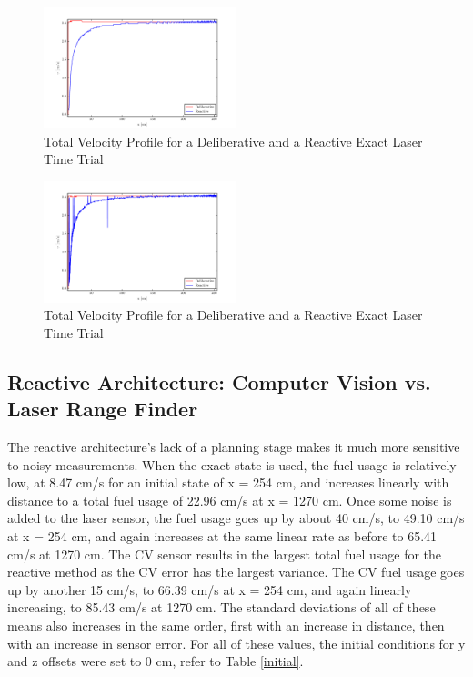 \documentclass[journal, 10pt]{IEEEtran}
\begin{document}
\begin{figure}[tb]
\begin{center}
\includegraphics[width=0.5\textwidth]{figures/TotalVelocityClean.pdf}
\caption{Total Velocity Profile for a Deliberative and a Reactive Exact Laser Time Trial }
\label{clean_total}
\end{center}
\end{figure}

\begin{figure}[tb]
\begin{center}
\includegraphics[width=0.5\textwidth]{figures/TotalVelocityNoisy.pdf}
\caption{Total Velocity Profile for a Deliberative and a Reactive Exact Laser Time Trial }
\label{noisy_total}
\end{center}
\end{figure}

\subsection{Reactive Architecture: Computer Vision vs. Laser Range Finder}
The reactive architecture's lack of a planning stage makes it much more sensitive to noisy measurements. When the exact state is used, the fuel usage is relatively low, at 8.47 cm/s for an initial state of x = 254 cm, and increases linearly with distance to a total fuel usage of 22.96 cm/s at x = 1270 cm. Once some noise is added to the laser sensor, the fuel usage goes up by about 40 cm/s, to 49.10 cm/s at x = 254 cm, and again increases at the same linear rate as before to 65.41 cm/s at 1270 cm. The CV sensor results in the largest total fuel usage for the reactive method as the CV error has the largest variance. The CV fuel usage goes up by another 15 cm/s, to 66.39 cm/s at x = 254 cm, and again linearly increasing, to 85.43 cm/s at 1270 cm. The standard deviations of all of these means also increases in the same order, first with an increase in distance, then with an increase in sensor error. For all of these values, the initial conditions for y and z offsets were set to 0 cm, refer to Table \ref{initial}.
\end{document}

